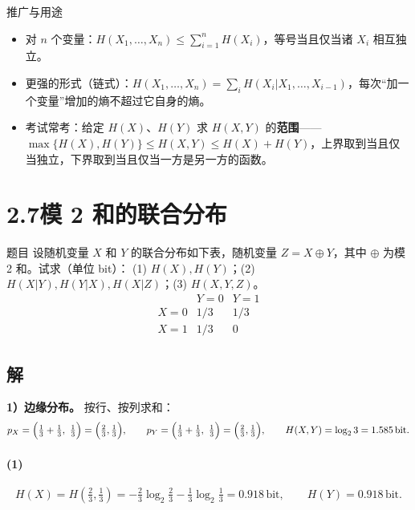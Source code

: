 \documentclass[11pt,a4paper]{ctexart}
\newcommand{\Hx}[1]{H\!\left(#1\right)}
\newcommand{\lb}{\log_{2}}
\newcommand{\bit}{\,\text{bit}}
\begin{document}
\begin{keypoint}{推广与用途}
\begin{itemize}[leftmargin=1.6em,itemsep=1pt,topsep=2pt]
  \item 对 $n$ 个变量：$\Hx{X_1,\dots,X_n}\le\sum_{i=1}^{n}\Hx{X_i}$，等号当且仅当诸 $X_i$ 相互独立。
  \item 更强的形式（链式）：$\Hx{X_1,\dots,X_n}=\sum_{i}\Hx{X_i|X_1,\dots,X_{i-1}}$，每次“加一个变量”增加的熵不超过它自身的熵。
  \item 考试常考：给定 $\Hx{X}$、$\Hx{Y}$ 求 $\Hx{X,Y}$ 的\textbf{范围}——
        $\max\{\Hx{X},\Hx{Y}\}\le \Hx{X,Y}\le \Hx{X}+\Hx{Y}$，上界取到当且仅当独立，下界取到当且仅当一方是另一方的函数。
\end{itemize}
\end{keypoint}

\section*{2.7\quad 模 2 和的联合分布}

\begin{problem}{题目}
设随机变量 $X$ 和 $Y$ 的联合分布如下表，随机变量 $Z=X\oplus Y$，其中 $\oplus$ 为模 2 和。试求（单位 bit）：
(1) $\Hx{X},\Hx{Y}$；(2) $\Hx{X|Y},\Hx{Y|X},\Hx{X|Z}$；(3) $\Hx{X,Y,Z}$。
\[
\begin{array}{c|cc}
 & Y=0 & Y=1\\ \hline
X=0 & 1/3 & 1/3\\
X=1 & 1/3 & 0
\end{array}
\]
\end{problem}

\subsection*{解}
\textbf{1）边缘分布。} 按行、按列求和：
\[
p_X=\Bigl(\tfrac13+\tfrac13,\ \tfrac13\Bigr)=\Bigl(\tfrac23,\tfrac13\Bigr),\qquad
p_Y=\Bigl(\tfrac13+\tfrac13,\ \tfrac13\Bigr)=\Bigl(\tfrac23,\tfrac13\Bigr),
\qquad \Hx{X,Y}=\lb 3=1.585\bit .
\]

\paragraph{(1)}
\[
\boxed{\Hx{X}=\Hx{\tfrac23,\tfrac13}=-\tfrac23\lb\tfrac23-\tfrac13\lb\tfrac13=0.918\bit},\qquad
\boxed{\Hx{Y}=0.918\bit } .
\]
\end{document}
